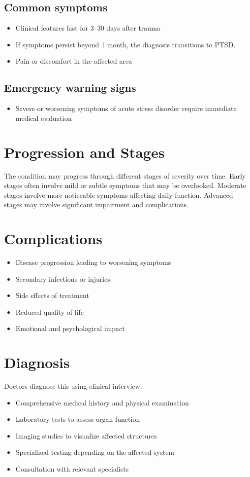 \subsection{Common symptoms}
\begin{itemize}[noitemsep]
  \item Clinical features last for 3--30 days after trauma
  \item If symptoms persist beyond 1 month, the diagnosis transitions to PTSD.
  \item Pain or discomfort in the affected area
  \end{itemize}
\subsection{Emergency warning signs}
\begin{itemize}[noitemsep]
  \item Severe or worsening symptoms of acute stress disorder require immediate medical evaluation
\end{itemize}
\section{Progression and Stages}
The condition may progress through different stages of severity over time. Early stages often involve mild or subtle symptoms that may be overlooked. Moderate stages involve more noticeable symptoms affecting daily function. Advanced stages may involve significant impairment and complications.
\section{Complications}
\begin{itemize}[noitemsep]
  \item Disease progression leading to worsening symptoms
  \item Secondary infections or injuries
  \item Side effects of treatment
  \item Reduced quality of life
  \item Emotional and psychological impact
\end{itemize}
\section{Diagnosis}
Doctors diagnose this using clinical interview.

\begin{itemize}[noitemsep]
  \item Comprehensive medical history and physical examination
  \item Laboratory tests to assess organ function
  \item Imaging studies to visualize affected structures
  \item Specialized testing depending on the affected system
  \item Consultation with relevant specialists
\end{itemize}
